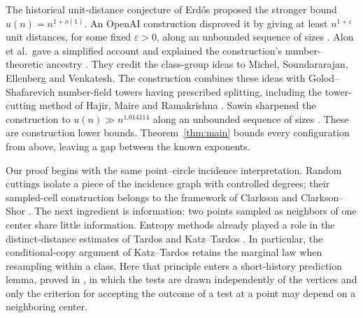 The historical unit-distance conjecture of Erd\H{o}s proposed the stronger
bound \(u(n)=n^{1+o(1)}\). An OpenAI construction disproved it by giving
at least \(n^{1+\varepsilon}\) unit distances, for some fixed
\(\varepsilon>0\), along an unbounded sequence of sizes
\cite[Theorem~1.1]{openaiUnitLower2026}. Alon et al.\ gave a simplified
account and explained the construction's number-theoretic ancestry
\cite[Sections~1.2--1.3]{alonEtAl2026}. They credit the class-group
ideas to Michel, Soundararajan, Ellenberg and Venkatesh. The construction
combines these ideas with Golod--Shafarevich
number-field towers having prescribed splitting, including the
tower-cutting method of Hajir, Maire and Ramakrishna
\cite{ellenbergVenkatesh2007,golodShafarevich1964,hajirMaireRamakrishna2021}.
Sawin sharpened the construction to \(u(n)\gg n^{1.014114}\) along an
unbounded sequence of sizes \cite[Theorem~1]{sawin2026}.
These are construction lower bounds. Theorem~\ref{thm:main} bounds every
configuration from above, leaving a gap between the known exponents.

Our proof begins with the same point--circle incidence interpretation.
Random cuttings isolate a piece of the incidence graph with controlled
degrees; their sampled-cell construction belongs to the framework of
Clarkson and Clarkson--Shor \cite{Clarkson1987,ClarksonShor1989}.
The next ingredient is information: two points sampled as neighbors of
one center share little information. Entropy methods already played a
role in the distinct-distance estimates of Tardos and Katz--Tardos
\cite{Tardos2003,KatzTardos}. In particular, the conditional-copy
argument of Katz--Tardos retains the marginal law when resampling
within a class. Here that principle enters a short-history prediction
lemma, proved in , in which the tests are drawn
independently of the vertices and only the criterion for accepting the
outcome of a test at a point may depend on a neighboring center.

